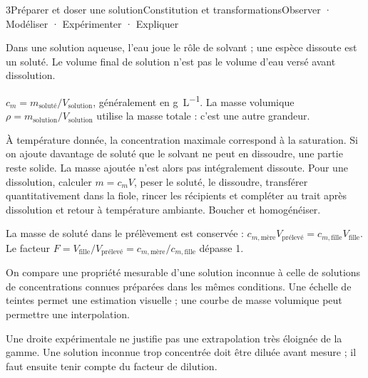 \begin{ouverture}[colorimetrie]{3}{Préparer et doser une solution}{Constitution et transformations}{Observer · Modéliser · Expérimenter · Expliquer}
\end{ouverture}
\essentiel
{}
Dans une solution aqueuse, l'eau joue le rôle de solvant ; une espèce dissoute est un soluté. Le volume final de solution n'est pas le volume d'eau versé avant dissolution.
\begin{definition}$c_m=m_{\mathrm{soluté}}/V_{\mathrm{solution}}$, généralement en \unit{g.L^{-1}}. La masse volumique $\rho=m_{\mathrm{solution}}/V_{\mathrm{solution}}$ utilise la masse totale : c'est une autre grandeur.\end{definition}
À température donnée, la concentration maximale correspond à la saturation. Si on ajoute davantage de soluté que le solvant ne peut en dissoudre, une partie reste solide. La masse ajoutée n'est alors pas intégralement dissoute.
Pour une dissolution, calculer $m=c_mV$, peser le soluté, le dissoudre, transférer quantitativement dans la fiole, rincer les récipients et compléter au trait après dissolution et retour à température ambiante. Boucher et homogénéiser.
\begin{loi}La masse de soluté dans le prélèvement est conservée : $c_{m,\mathrm{mère}}V_{\mathrm{prélevé}}=c_{m,\mathrm{fille}}V_{\mathrm{fille}}$. Le facteur $F=V_{\mathrm{fille}}/V_{\mathrm{prélevé}}=c_{m,\mathrm{mère}}/c_{m,\mathrm{fille}}$ dépasse 1.\end{loi}
On compare une propriété mesurable d'une solution inconnue à celle de solutions de concentrations connues préparées dans les mêmes conditions. Une échelle de teintes permet une estimation visuelle ; une courbe de masse volumique peut permettre une interpolation.
\begin{attention}Une droite expérimentale ne justifie pas une extrapolation très éloignée de la gamme. Une solution inconnue trop concentrée doit être diluée avant mesure ; il faut ensuite tenir compte du facteur de dilution.\end{attention}
